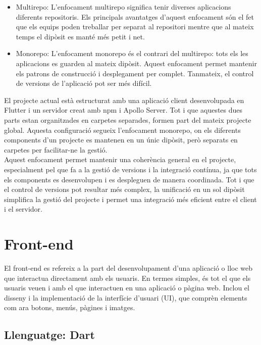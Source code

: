 \documentclass[a4paper,12pt,twoside]{ThesisStyle}
\begin{document}
\begin{itemize}
    \item Multirepo: L'enfocament multirepo significa tenir diverses aplicacions
    diferents repositoris. Els principals avantatges d'aquest enfocament són el fet que
    els equips poden treballar per separat al repositori mentre que al mateix temps
    el dipòsit es manté més petit i net.
    \item Monorepo: L'enfocament monorepo és el contrari del multirepo: tots els
    les aplicacions es guarden al mateix dipòsit. Aquest enfocament permet mantenir els patrons de construcció i desplegament per complet. Tanmateix, el control de versions de l'aplicació pot ser més difícil.
    
\end{itemize}


El projecte actual està estructurat amb una aplicació client desenvolupada en Flutter i un servidor creat amb npm i Apollo Server. Tot i que aquestes dues parts estan organitzades en carpetes separades, formen part del mateix projecte global. Aquesta configuració segueix l'enfocament monorepo, on els diferents components d'un projecte es mantenen en un únic dipòsit, però separats en carpetes per facilitar-ne la gestió.\\

Aquest enfocament permet mantenir una coherència general en el projecte, especialment pel que fa a la gestió de versions i la integració contínua, ja que tots els components es desenvolupen i es despleguen de manera coordinada. Tot i que el control de versions pot resultar més complex, la unificació en un sol dipòsit simplifica la gestió del projecte i permet una integració més eficient entre el client i el servidor.




\section{Front-end}
\label{subsec: Front-end}

El front-end es refereix a la part del desenvolupament d'una aplicació o lloc web que interactua directament amb els usuaris. En termes simples, és tot el que els usuaris veuen i amb el que interactuen en una aplicació o pàgina web. Inclou el disseny i la implementació de la interfície d'usuari (UI), que comprèn elements com ara botons, menús, pàgines i imatges.


\subsection{Llenguatge: Dart}
\label{subsec:Llenguatge: Dart}
\end{document}
